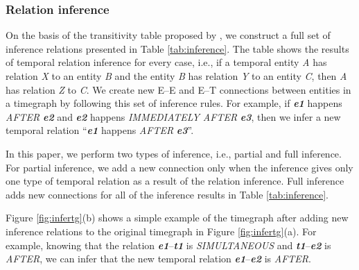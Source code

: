 \documentclass[english]{jnlp_1.4}
\begin{document}
\subsubsection{Relation inference}
\label{subsubsec:infer}

\begin{table}[p]
\begin{center}
\end{center}
\end{table}

On the basis of the transitivity table proposed by , we construct a full set of inference relations presented in Table \ref{tab:inference}.
The table shows the results of temporal relation inference for every case, i.e., if a temporal entity \textit{A} has relation \textit{X} to an entity \textit{B} and the entity \textit{B} has relation \textit{Y} to an entity \textit{C}, then \textit{A} has relation \textit{Z} to \textit{C}. 
We create new E--E and E--T connections between entities in a timegraph by following this set of inference rules.
For example, if \emph{\textbf{e1}} happens \emph{\footnotesize AFTER} \emph{\textbf{e2}} and \emph{\textbf{e2}} happens \emph{\footnotesize IMMEDIATELY AFTER} \emph{\textbf{e3}}, then we infer a new temporal relation ``\emph{\textbf{e1}} happens \emph{\footnotesize AFTER} \emph{\textbf{e3}}''.

In this paper, we perform two types of inference, i.e., partial and full inference. 
For partial inference, we add a new connection only when the inference gives only one type of temporal relation as a result of the relation inference.
Full inference adds new connections for all of the inference results in Table \ref{tab:inference}.

Figure \ref{fig:infertg}(b) shows a simple example of the timegraph after adding new inference relations to the original timegraph in Figure \ref{fig:infertg}(a).
For example, knowing that the relation \emph{\textbf{e1}}--\emph{\textbf{t1}} is \emph{\footnotesize SIMULTANEOUS} and \emph{\textbf{t1}}--\emph{\textbf{e2}} is \emph{\footnotesize AFTER}, we can infer that the new temporal relation \emph{\textbf{e1}}--\emph{\textbf{e2}} is \emph{\footnotesize AFTER}.
\end{document}
